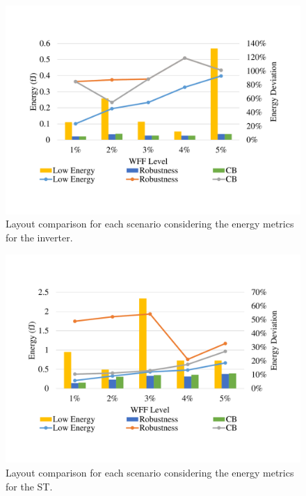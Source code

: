 \documentclass[pgmicro,mestrado,english]{iiufrgs}
\begin{document}



    \begin{figure}[]
        \centering
            \includegraphics[width=1\textwidth, trim={1.25cm 2cm 2cm 3cm}, clip]{comp3Linv2Energy.pdf}
            \caption{Layout comparison for each scenario considering the energy metrics for the inverter.}
        \label{figscCompINV}
    \end{figure}

    \begin{figure}[]
        \centering
            \includegraphics[width=1\textwidth, trim={1.25cm 3cm 2cm 3cm}, clip]{comp3Lst2Energy.pdf}
            \caption{Layout comparison for each scenario considering the energy metrics for the ST.}
        \label{figscCompST}
    \end{figure}
\end{document}
